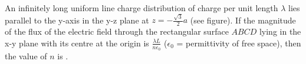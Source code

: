 

    \item An infinitely long uniform line charge distribution of charge per unit length $\lambda$ lies parallel to the y-axis in the y-z plane at $z = -\frac{\sqrt{3}}{2}a$ (see figure). If the magnitude of the flux of the electric field through the rectangular surface $ABCD$ lying in the x-y plane with its centre at the origin is $\frac{\lambda L}{n\epsilon_0}$ ($\epsilon_0$ = permittivity of free space), then the value of $n$ is \underline{\hspace{2.5 cm}}.
    
    \begin{center}
    \end{center}

    \begin{solution}
       

    \end{solution}

